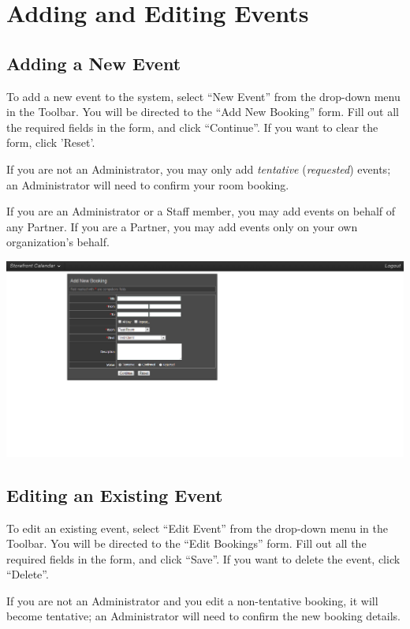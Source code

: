 \section{Adding and Editing Events}


\subsection{Adding a New Event}

To add a new event to the system, select ``New Event'' from the drop-down menu in the Toolbar. You will be directed to the ``Add New Booking'' form. Fill out all the required fields in the form, and click ``Continue''. If you want to clear the form, click 'Reset'.

If you are not an Administrator, you may only add \textit{tentative} (\textit{requested}) events; an Administrator will need to confirm your room booking.

If you are an Administrator or a Staff member, you may add events on behalf of any Partner. If you are a Partner, you may add events only on your own organization's behalf.

\includegraphics[width=\linewidth]{screenshots/img_addevent}

\newpage


\subsection{Editing an Existing Event}

To edit an existing event, select ``Edit Event'' from the drop-down menu in the Toolbar. You will be directed to the ``Edit Bookings'' form. Fill out all the required fields in the form, and click ``Save''. If you want to delete the event, click ``Delete''.

If you are not an Administrator and you edit a non-tentative booking, it will become tentative; an Administrator will need to confirm the new booking details.

